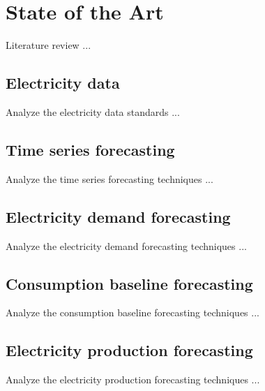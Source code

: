 \chapter{State of the Art}
\label{cha:soa}
\vspace{0.4 cm}

Literature review ...


\section{Electricity data}
\label{sec:data}
\vspace{0.2 cm}

Analyze the electricity data standards ...
\cite{CHEN201798}
\cite{8577770}
\cite{8284772}
\cite{5772503}


\section{Time series forecasting}
\label{sec:timeseries}
\vspace{0.2 cm}

Analyze the time series forecasting techniques ...


\section{Electricity demand forecasting}
\label{sec:demandsoa}
\vspace{0.2 cm}

Analyze the electricity demand forecasting techniques ...


\section{Consumption baseline forecasting}
\label{sec:baselinesoa}
\vspace{0.2 cm}

Analyze the consumption baseline forecasting techniques ...


\section{Electricity production forecasting}
\label{sec:productionsoa}
\vspace{0.2 cm}

Analyze the electricity production forecasting techniques ...
